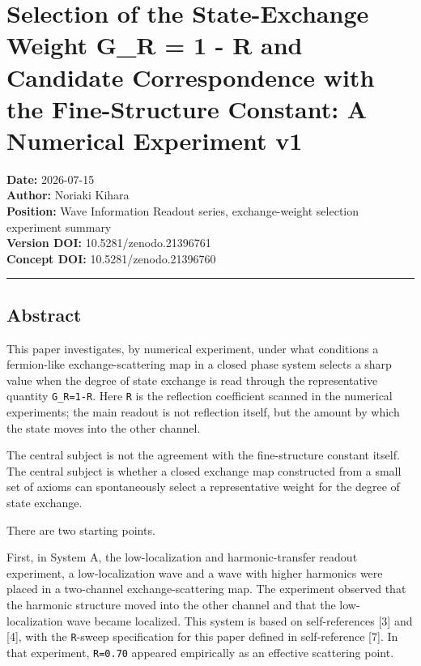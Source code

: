 \documentclass[
]{article}
\author{}
\date{}
\begin{document}
\section{Selection of the State-Exchange Weight G\_R = 1 - R and
Candidate Correspondence with the Fine-Structure Constant: A Numerical
Experiment
v1}\label{selection-of-the-state-exchange-weight-g_r-1---r-and-candidate-correspondence-with-the-fine-structure-constant-a-numerical-experiment-v1}

\textbf{Date:} 2026-07-15\\
\textbf{Author:} Noriaki Kihara\\
\textbf{Position:} Wave Information Readout series, exchange-weight
selection experiment summary\\
\textbf{Version DOI:} 10.5281/zenodo.21396761\\
\textbf{Concept DOI:} 10.5281/zenodo.21396760

\begin{center}\rule{0.5\linewidth}{0.5pt}\end{center}

\subsection{Abstract}\label{abstract}

This paper investigates, by numerical experiment, under what conditions
a fermion-like exchange-scattering map in a closed phase system selects
a sharp value when the degree of state exchange is read through the
representative quantity \texttt{G\_R=1-R}. Here \texttt{R} is the
reflection coefficient scanned in the numerical experiments; the main
readout is not reflection itself, but the amount by which the state
moves into the other channel.

The central subject is not the agreement with the fine-structure
constant itself. The central subject is whether a closed exchange map
constructed from a small set of axioms can spontaneously select a
representative weight for the degree of state exchange.

There are two starting points.

First, in System A, the low-localization and harmonic-transfer readout
experiment, a low-localization wave and a wave with higher harmonics
were placed in a two-channel exchange-scattering map. The experiment
observed that the harmonic structure moved into the other channel and
that the low-localization wave became localized. This system is based on
self-references {[}3{]} and {[}4{]}, with the \texttt{R}-sweep
specification for this paper defined in self-reference {[}7{]}. In that
experiment, \texttt{R=0.70} appeared empirically as an effective
scattering point.
\end{document}
